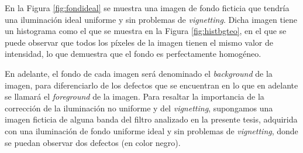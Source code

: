 En la Figura \ref{fig:fondideal} se muestra una imagen de fondo ficticia que tendría una iluminación ideal uniforme y sin problemas de  \textit{vignetting}. Dicha imagen tiene un histograma como el que se muestra en la Figura \ref{fig:histbgteo}, en el que se puede observar que todos los píxeles de la imagen tienen el mismo valor de intensidad, lo que demuestra que el fondo es perfectamente homogéneo.
	\begin{figure}[H]
		\begin{floatrow}
		\end{floatrow}
	\end{figure}
En adelante, el fondo de cada imagen será denominado el \textit{background} de la imagen, para diferenciarlo de los defectos que se encuentran en lo que en adelante se llamará el \textit{foreground} de la imagen. Para resaltar la importancia de la corrección de la iluminación no uniforme y del \textit{vignetting}, supongamos una imagen ficticia de alguna banda del filtro analizado en la presente tesis, adquirida con una iluminación de fondo uniforme ideal y sin problemas de \textit{vignetting}, donde se puedan observar dos defectos (en color negro).
